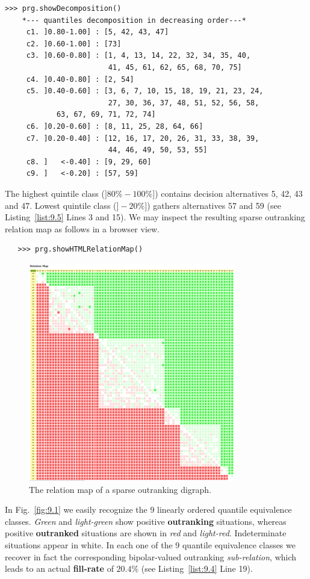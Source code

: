\begin{lstlisting}[caption={The quantiles decomposition of a pre-ranked outranking digraph},label=list:9.5]
>>> prg.showDecomposition()
    *--- quantiles decomposition in decreasing order---*
     c1. ]0.80-1.00] : [5, 42, 43, 47]
     c2. ]0.60-1.00] : [73]
     c3. ]0.60-0.80] : [1, 4, 13, 14, 22, 32, 34, 35, 40,
                        41, 45, 61, 62, 65, 68, 70, 75]
     c4. ]0.40-0.80] : [2, 54]
     c5. ]0.40-0.60] : [3, 6, 7, 10, 15, 18, 19, 21, 23, 24,
                        27, 30, 36, 37, 48, 51, 52, 56, 58,
			63, 67, 69, 71, 72, 74]
     c6. ]0.20-0.60] : [8, 11, 25, 28, 64, 66]
     c7. ]0.20-0.40] : [12, 16, 17, 20, 26, 31, 33, 38, 39,
                        44, 46, 49, 50, 53, 55]
     c8. ]   <-0.40] : [9, 29, 60]
     c9. ]   <-0.20] : [57, 59]
\end{lstlisting}

The highest quintile class ($]80\%-100\%]$) contains decision alternatives 5, 42, 43 and 47. Lowest quintile class ($]-20\%]$) gathers alternatives 57 and 59 (see Listing~\vref{list:9.5} Lines 3 and 15). We may inspect the resulting sparse outranking relation map as follows in a browser view.

\begin{lstlisting}
   >>> prg.showHTMLRelationMap()
\end{lstlisting}

\begin{figure}[h]
\includegraphics[width=9cm]{Figures/9-1-sparse75RelationMap.png}
\caption{The relation map of a sparse outranking digraph.}
\label{fig:9.1}       %
\end{figure}
\clearpage
In Fig.~\vref{fig:9.1} we easily recognize the 9 linearly ordered quantile equivalence classes. \emph{Green} and \emph{light-green} show positive \textbf{outranking} situations, whereas positive \textbf{outranked} situations are shown in \emph{red} and \emph{light-red}. Indeterminate situations appear in white. In each one of the 9 quantile equivalence classes we recover in fact the corresponding bipolar-valued outranking \emph{sub-relation}, which leads to an actual \textbf{fill-rate} of $20.4\%$ (see Listing~\vref{list:9.4} Line 19).

